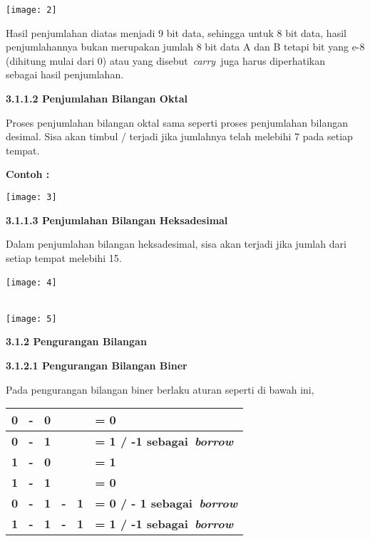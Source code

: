 \documentclass[11pt,fleqn]{book} %
\begin{document}
\begin{center}
\noindent \texttt{[image: 2]}
\end{center}

\noindent 

\noindent Hasil penjumlahan diatas menjadi 9 bit data, sehingga untuk 8 bit data, hasil penjumlahannya bukan merupakan jumlah 8 bit data A dan B tetapi bit yang e-8 (dihitung mulai dari 0) atau yang disebut~\textit{carry}~juga harus diperhatikan~ sebagai hasil penjumlahan.

\noindent \textbf{3.1.1.2 Penjumlahan Bilangan Oktal}

Proses penjumlahan bilangan oktal sama seperti proses penjumlahan bilangan desimal. Sisa akan timbul / terjadi jika jumlahnya telah melebihi 7 pada setiap tempat.

\noindent \textbf{Contoh :}

\begin{center}
\noindent \texttt{[image: 3]}
\end{center}

\noindent 

\noindent \textbf{3.1.1.3 Penjumlahan Bilangan Heksadesimal}

Dalam penjumlahan bilangan heksadesimal, sisa akan terjadi jika jumlah dari setiap tempat melebihi 15.

\begin{center}
\noindent \texttt{[image: 4]}~ ~ ~ ~ ~ ~ ~ ~ ~ ~ ~ ~ ~ ~ ~ ~ ~ ~ ~ ~ ~ ~ ~ ~ ~ ~ ~ ~ ~ ~ ~ ~ ~ ~ ~ ~ ~ ~ ~ ~ ~ ~ ~ ~~
\end{center}

\noindent 

\begin{center}
\noindent \texttt{[image: 5]}
\end{center}

\noindent 

\noindent \textbf{3.1.2 Pengurangan Bilangan}

\noindent \textbf{3.1.2.1 Pengurangan Bilangan Biner}

Pada pengurangan bilangan biner berlaku aturan seperti di bawah ini,

\begin{center}
\begin{tabular}{|p{0.9in}|p{1.3in}|} \hline 
\textbf{0~ -~ 0} & \textbf{= 0} \\ \hline 
\textbf{0~ -~ 1} & \textbf{= 1 / -1 sebagai~\textit{borrow}} \\ \hline 
\textbf{1~ -~ 0} & \textbf{= 1} \\ \hline 
\textbf{1~ -~ 1} & \textbf{= 0} \\ \hline 
\textbf{0~ -~ 1~ -~ 1} & \textbf{= 0 / - 1 sebagai~\textit{borrow}} \\ \hline 
\textbf{1~ -~ 1~ -~ 1} & \textbf{= 1 / -1 sebagai~\textit{borrow}} \\ \hline 
\end{tabular}
\end{center}
\end{document}
